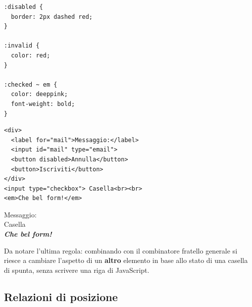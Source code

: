 \begin{affianco}[0.58]
\codicepiccolo
\begin{lstlisting}[style=css, name=form-states.css]
:disabled {
  border: 2px dashed red;
}

:invalid {
  color: red;
}

:checked ~ em {
  color: deeppink;
  font-weight: bold;
}
\end{lstlisting}
\begin{lstlisting}[style=html, name=form-states.html]
<div>
  <label for="mail">Messaggio:</label>
  <input id="mail" type="email">
  <button disabled>Annulla</button>
  <button>Iscriviti</button>
</div>
<input type="checkbox"> Casella<br><br>
<em>Che bel form!</em>
\end{lstlisting}
\risultato
\begin{browser}
  Messaggio:\wtcampo[2.2cm]{\textcolor{css-red}{mario.rossi}}%
  \\[5pt]
   Casella\\[8pt]
  \textcolor{css-deeppink}{\textbf{\textit{Che bel form!}}}
\end{browser}
\end{affianco}

Da notare l'ultima regola: combinando  con il combinatore
fratello generale si riesce a cambiare l'aspetto di un \textbf{altro} elemento
in base allo stato di una casella di spunta, senza scrivere una riga di
JavaScript.


\subsection{Relazioni di posizione}

